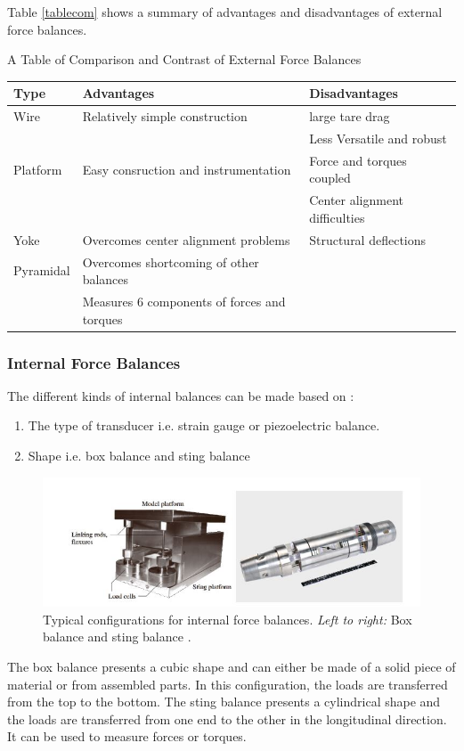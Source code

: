 Table \ref{tablecom} shows a summary of advantages and disadvantages of external force balances.
\clearpage
\begin{center}
\begin{table}[H]
\caption[Comparison of Force Balances]{A Table of Comparison and Contrast of External Force Balances}
\label{tablecom}
\end{table}
\begin{tabular}{|l|l|l|}
\hline
\textbf{Type} & \textbf{Advantages} & \textbf{Disadvantages}\\
\hline
Wire & Relatively simple construction & large tare drag\\
 & & Less Versatile and robust\\
 \hline
Platform & Easy consruction and instrumentation & Force and torques coupled\\
 & & Center alignment difficulties\\
 \hline
 Yoke & Overcomes center alignment problems & Structural deflections\\
 \hline
 Pyramidal & Overcomes shortcoming of other balances & \\
 & Measures 6 components of forces and torques & \\
 \hline 
\end{tabular}
\end{center}
\subsubsection{Internal Force Balances}
The different kinds of internal balances can be made based on \cite{ferreira2015design}:
\begin{enumerate}
\item The type of transducer i.e. strain gauge or piezoelectric balance.
\item Shape i.e. box balance and sting balance
\end{enumerate} 
\begin{center}
	\begin{figure}[H]
	\centering
	\includegraphics[width=0.8\linewidth]{Figures/Fig7}
	\caption[Internal force balances]{Typical configurations for internal force balances. \textit{Left to right:} Box balance and sting balance \cite{ferreira2015design}.}
	\end{figure}
\end{center}
The box balance presents a cubic shape and can either be made of a solid piece of material or from assembled parts. In this configuration, the loads are transferred from the top to the bottom. The sting balance presents a cylindrical shape and the loads are transferred from one end to the other in the longitudinal direction. It can be used to measure forces or torques.


